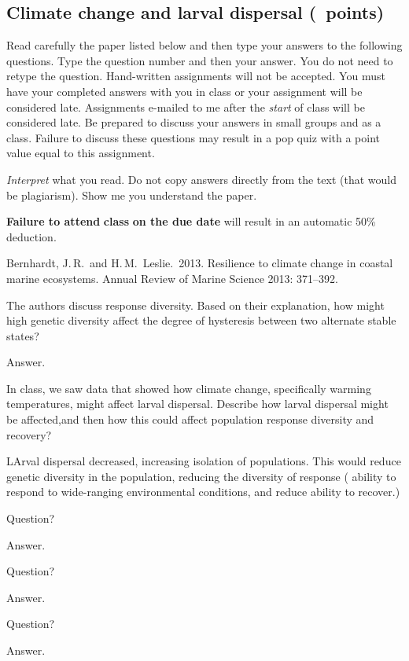 \documentclass[12pt, addpoints]{exam}
\newcommand*\AnswerBox[2]{%
    \parbox[t][#1]{0.92\textwidth}{%
    \begin{solution}#2\end{solution}}
}
\begin{document}
\subsection*{Climate change and larval dispersal (\numpoints\ points)}

Read carefully the paper listed below and then type your answers to the following questions.
Type the question number and then your answer. You do not need to retype the question. Hand-written
assignments will not be accepted. You must have your completed answers
with you in class or your assignment will be considered late. Assignments e-mailed to me after the \emph{start} of class will be
considered late. Be prepared to discuss your answers in small groups and as a class. Failure
to discuss these questions may result in a pop quiz with a point value
equal to this assignment.

\emph{Interpret} what you read. Do not copy answers directly from the text (that would
be plagiarism). Show me you understand the paper.

\textbf{Failure to attend} \textbf{class} \textbf{on the due date} will
result in an automatic 50\% deduction.

\begin{hangparas}{1.5em}{1}
Bernhardt, J.\,R.~and H.\,M.~Leslie.~2013. Resilience to climate change in 
coastal marine ecosystems. Annual Review of Marine Science 2013: 371--392.

\end{hangparas}


\begin{questions}

\question[5]
The authors discuss response diversity. Based on their explanation, how might 
high genetic diversity affect the degree of hysteresis between two alternate 
stable states?


\AnswerBox{4\baselineskip}{%
Answer.
}

\question[5]
In class, we saw data that showed how climate change, specifically warming 
temperatures, might affect larval dispersal. Describe how larval dispersal 
might be affected,and then how this could affect population response diversity 
and recovery?


\AnswerBox{4\baselineskip}{%
	LArval dispersal decreased, increasing isolation of populations. This would
	reduce genetic diversity in the population, reducing the diversity of response (
	ability to respond to wide-ranging environmental conditions, and reduce ability
	to recover.)
}

\question[5]
Question?


\AnswerBox{4\baselineskip}{%
	Answer.
}


\question[5]
Question?


\AnswerBox{4\baselineskip}{%
	Answer.
}

\question[5]
Question?


\AnswerBox{4\baselineskip}{%
	Answer.
}


\end{questions}
\end{document}
